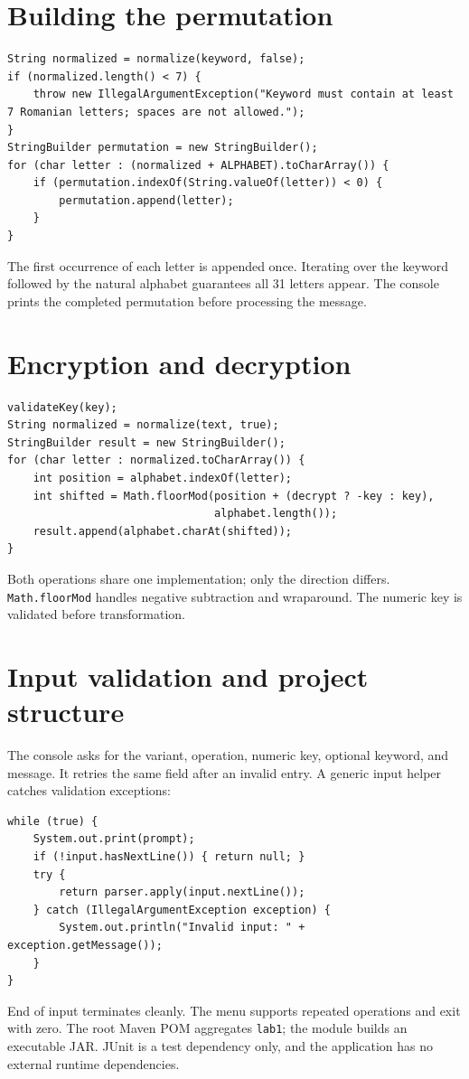 \documentclass{utmreport}
\begin{document}
\section{Building the permutation}
\begin{lstlisting}
String normalized = normalize(keyword, false);
if (normalized.length() < 7) {
    throw new IllegalArgumentException("Keyword must contain at least 7 Romanian letters; spaces are not allowed.");
}
StringBuilder permutation = new StringBuilder();
for (char letter : (normalized + ALPHABET).toCharArray()) {
    if (permutation.indexOf(String.valueOf(letter)) < 0) {
        permutation.append(letter);
    }
}
\end{lstlisting}
The first occurrence of each letter is appended once. Iterating over the keyword followed by the natural alphabet guarantees all 31 letters appear. The console prints the completed permutation before processing the message.

\section{Encryption and decryption}
\begin{lstlisting}
validateKey(key);
String normalized = normalize(text, true);
StringBuilder result = new StringBuilder();
for (char letter : normalized.toCharArray()) {
    int position = alphabet.indexOf(letter);
    int shifted = Math.floorMod(position + (decrypt ? -key : key),
                                alphabet.length());
    result.append(alphabet.charAt(shifted));
}
\end{lstlisting}
Both operations share one implementation; only the direction differs. \texttt{Math.floorMod} handles negative subtraction and wraparound. The numeric key is validated before transformation.

\section{Input validation and project structure}
The console asks for the variant, operation, numeric key, optional keyword, and message. It retries the same field after an invalid entry. A generic input helper catches validation exceptions:
\begin{lstlisting}
while (true) {
    System.out.print(prompt);
    if (!input.hasNextLine()) { return null; }
    try {
        return parser.apply(input.nextLine());
    } catch (IllegalArgumentException exception) {
        System.out.println("Invalid input: " + exception.getMessage());
    }
}
\end{lstlisting}
End of input terminates cleanly. The menu supports repeated operations and exit with zero. The root Maven POM aggregates \texttt{lab1}; the module builds an executable JAR. JUnit is a test dependency only, and the application has no external runtime dependencies.
\end{document}
